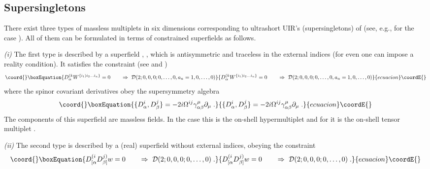 \documentclass[a4paper,12pt]{article}
\begin{document}
 
\subsection{Supersingletons}

There exist three types of massless multiplets in six dimensions 
corresponding to ultrashort UIR's (supersingletons) of 
\coordHE{} (see, e.g., \cite{GT} for the case \coordHE{}). 
All of them can be formulated in terms of constrained superfields 
as follows. 


{\sl (i)} The first type is described by a superfield 
\coordHE{}, \coordHE{}, which is 
antisymmetric and traceless in the external \coordHE{} 
indices (for even \coordHE{} one can impose a reality condition). It 
satisfies the constraint (see \cite{HSiT} and \cite{Park}) 
\begin{equation}\coord{}\boxEquation{\label{6.19}
  D^{(k}_\alpha W^{\{i_1)i_2\ldots i_n\}}=0 \qquad \Rightarrow \ {\cal 
D}(2;0,0,0;0,\ldots,0,a_{n}=1,0,\ldots,0) 
}{D^{(k}_\alpha W^{\{i_1)i_2\ldots i_n\}}=0 \qquad \Rightarrow \ {\cal 
D}(2;0,0,0;0,\ldots,0,a_{n}=1,0,\ldots,0) 
}{ecuacion}\coordE{}\end{equation}
where the spinor covariant derivatives obey the supersymmetry 
algebra 
\begin{equation}\coord{}\boxEquation{\label{6.21}
  \{ D^i_\alpha, D^j_\beta\} = 
-2i\Omega^{ij}\gamma^\mu_{\alpha\beta}\partial_\mu\;. 
}{\{ D^i_\alpha, D^j_\beta\} = 
-2i\Omega^{ij}\gamma^\mu_{\alpha\beta}\partial_\mu\;. 
}{ecuacion}\coordE{}\end{equation}
The components of this superfield are massless fields. In the case 
\coordHE{} this is the on-shell \coordHE{} hypermultiplet and for 
\coordHE{} it is the on-shell \coordHE{} tensor multiplet 
\cite{HSiT,bsvp}.  

{\sl (ii)} The second type is described by a (real) superfield 
without external indices, \coordHE{} obeying the constraint 
\begin{equation}\coord{}\boxEquation{\label{6.23}
 D^{(i}_{[\alpha} D^{j)}_{\beta]} w = 0 \qquad \Rightarrow \ {\cal 
D}(2;0,0,0;0,\ldots,0)\;.
}{D^{(i}_{[\alpha} D^{j)}_{\beta]} w = 0 \qquad \Rightarrow \ {\cal 
D}(2;0,0,0;0,\ldots,0)\;.
}{ecuacion}\coordE{}\end{equation}
\end{document}
